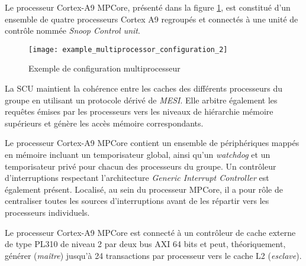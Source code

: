             Le processeur Cortex-A9 MPCore, présenté dans la figure \ref{fig:example_multiprocessor_configuration}, est constitué d'un ensemble de quatre processeurs Cortex A9 regroupés et connectés à une unité de contrôle nommée \emph{Snoop Control unit}.

            \begin{figure}[!ht]
                \centering
                \texttt{[image: example\_multiprocessor\_configuration\_2]}
                 \caption{Exemple de configuration multiprocesseur \cite{manuel:cortex_a9_mpcore_trm}}
                 \label{fig:example_multiprocessor_configuration}
             \end{figure}
% 
            La SCU maintient la cohérence entre les caches des différents processeurs du groupe en utilisant un protocole dérivé de \emph{MESI}. Elle arbitre également les requêtes émises par les processeurs vers les niveaux de hiérarchie mémoire supérieurs et génère les accès mémoire correspondants.

            Le processeur Cortex-A9 MPCore contient un ensemble de périphériques mappés en mémoire incluant un temporisateur global, ainsi qu'un \emph{watchdog} et un temporisateur privé pour chacun des processeurs du groupe.
            Un contrôleur d'interruptions respectant l'architecture \emph{Generic Interrupt Controller} \cite{manuel:gic} est également présent. Localisé, au sein du processeur MPCore, il a pour rôle de centraliser toutes les sources d'interruptions avant de les répartir vers les processeurs individuels.

            Le processeur Cortex-A9 MPCore est connecté à un contrôleur de cache externe de type PL310 de niveau 2 par deux bus AXI 64 bits et peut, théoriquement, générer (\emph{maître}) jusqu'à 24 transactions par processeur vers le cache L2 (\emph{esclave}).


